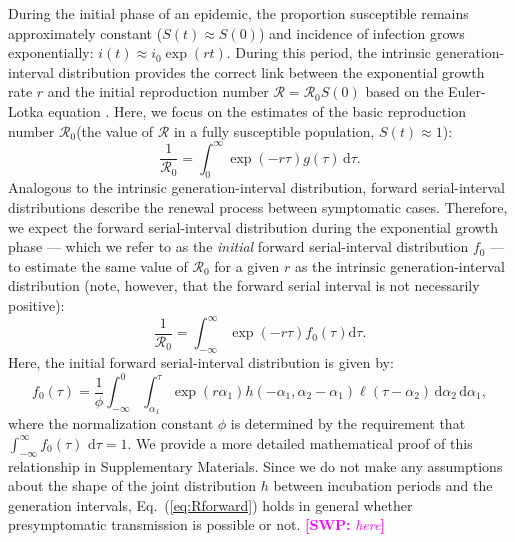 \documentclass[12pt]{article}
\newcommand{\comment}{\showcomment}
\newcommand{\showcomment}[3]{\textcolor{#1}{\textbf{[#2: }\textsl{#3}\textbf{]}}}
\newcommand{\swp}[1]{\comment{magenta}{SWP}{#1}}
\newcommand{\eref}[1]{Eq.~(\ref{eq:#1})}
\newcommand{\Rx}[1]{\ensuremath{{\mathcal R}_{#1}}\xspace}
\newcommand{\Ro}{\Rx{0}}
\newcommand{\RR}{\ensuremath{{\mathcal R}}\xspace}
\newcommand{\dd}[1]{\ensuremath{\, \mathrm{d}#1}}
\newcommand{\dtau}{\dd{\tau}}
\newcommand{\pinf}{\ensuremath{\alpha_1}} %
\newcommand{\sinf}{\ensuremath{\alpha_2}} %
\newcommand{\idist}{\ell} %
\begin{document}
During the initial phase of an epidemic, the proportion susceptible remains approximately constant ($S(t) \approx S(0)$) and incidence of infection grows exponentially: $i(t) \approx i_0\exp(rt)$.
During this period, the intrinsic generation-interval distribution provides the correct link between the exponential growth rate $r$ and the initial reproduction number $\RR=\Ro S(0)$ based on the Euler-Lotka equation \citep{wallinga2007generation}.
Here, we focus on the estimates of the basic reproduction number \Ro (the value of \RR in a fully susceptible population, $S(t) \approx 1$):
\begin{equation}
\frac{1}{\Ro} = \int_0^\infty \exp(-r\tau) g(\tau) \dtau.
\label{eq:Rgen}
\end{equation}
Analogous to the intrinsic generation-interval distribution, 
forward serial-interval distributions describe the renewal process between symptomatic cases.
Therefore, we expect the forward serial-interval distribution during the exponential growth phase --- which we refer to as the \emph{initial} forward serial-interval distribution $f_0$ --- to estimate the same value of \Ro for a given $r$ as the intrinsic generation-interval distribution (note, however, that the forward serial interval is not necessarily positive):
\begin{equation}
\frac{1}{\Ro} = \int_{-\infty}^\infty \exp(-r\tau) f_{0}(\tau) \mathrm{d} \tau.
\label{eq:Rforward}
\end{equation}
Here, the initial forward serial-interval distribution is given by:
\begin{equation}
f_{0}(\tau) = \frac{1}{\phi} \int_{-\infty}^{0} \int_{\pinf}^{\tau} \exp(r \pinf) h(-\pinf, \sinf - \pinf) \idist(\tau - \sinf) \, \mathrm{d}\sinf\,\mathrm{d}\pinf,
\label{eq:initialSI}
\end{equation}
where the normalization constant $\phi$ is determined by the requirement that $\int_{-\infty}^\infty f_{0}(\tau)\,\dtau=1$.
We provide a more detailed mathematical proof of this relationship in Supplementary Materials.
Since we do not make any assumptions about the shape of the joint distribution $h$ between incubation periods and the generation intervals, \eref{Rforward} holds in general whether presymptomatic transmission is possible or not.
\swp{here}
\end{document}
